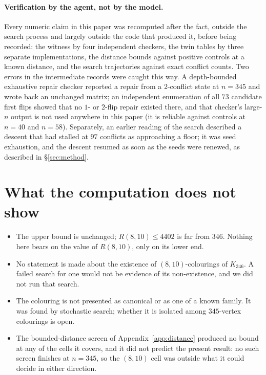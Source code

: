 \documentclass[11pt]{article}
\newcommand{\R}{R}
\begin{document}
\paragraph{Verification by the agent, not by the model.}
Every numeric claim in this paper was recomputed after the fact, outside the search process and
largely outside the code that produced it, before being recorded: the witness by four independent
checkers, the twin tables by three separate implementations, the distance bounds against positive
controls at a known distance, and the search trajectories against exact conflict counts. Two errors
in the intermediate records were caught this way. A depth-bounded exhaustive repair checker reported a
repair from a $2$-conflict state at $n=345$ and wrote back an unchanged matrix; an independent
enumeration of all $73$ candidate first flips showed that no $1$- or $2$-flip repair existed there,
and that checker's large-$n$ output is not used anywhere in this paper (it is reliable against
controls at $n=40$ and $n=58$). Separately, an earlier reading of the search described a descent that
had stalled at $97$ conflicts as approaching a floor; it was seed exhaustion, and the descent resumed
as soon as the seeds were renewed, as described in \S\ref{sec:method}.

\section{What the computation does not show}\label{sec:not}

\begin{itemize}
\item The upper bound is unchanged; $\R(8,10)\le 4402$ \cite{ds1} is far from $346$. Nothing here
      bears on the value of $\R(8,10)$, only on its lower end.
\item No statement is made about the existence of $(8,10)$-colourings of $K_{346}$. A failed search
      for one would not be evidence of its non-existence, and we did not run that search.
\item The colouring is not presented as canonical or as one of a known family. It was found by
      stochastic search; whether it is isolated among $345$-vertex colourings is open.
\item The bounded-distance screen of Appendix~\ref{app:distance} produced no bound at any of the
      cells it covers, and it did not predict the present result: no such screen finishes at
      $n=345$, so the $(8,10)$ cell was outside what it could decide in either direction.
\end{itemize}
\end{document}
